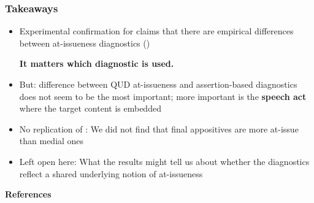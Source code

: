 \documentclass[compress, xcolor = dvipsnames, aspectratio=169, handout]{beamer}
\begin{document}
	\begin{frame}[t]\frametitle{Takeaways}
	
		\begin{itemize}
			\item Experimental confirmation for claims that there are empirical differences between at-issueness diagnostics (\citealt{snider_anaphoric_2017,snider_at-issuenessne_2017,snider_distinguishing_2018,koev_notions_2018,faller_discourse_2019,korotkova_evidential_2020})\\ \smallskip

			\begin{center}
				\textbf{It matters which diagnostic is used.}\bigskip
			\end{center}


			\item But: difference between QUD at-issueness and assertion-based diagnostics does not seem to be the most important; more important is the \textbf{speech act} where the target content is embedded \medskip

			\item No replication of \citealt{syrett_experimental_2015}: We did not find that final appositives are more at-issue than medial ones
			\medskip

			\item Left open here: What the results might tell us about whether the diagnostics reflect a shared underlying notion of at-issueness
		\end{itemize}

	
	\end{frame}



\begin{frame}[allowframebreaks]{\bfseries\opt References}
	\footnotesize
	
	

\end{frame}
\end{document}
